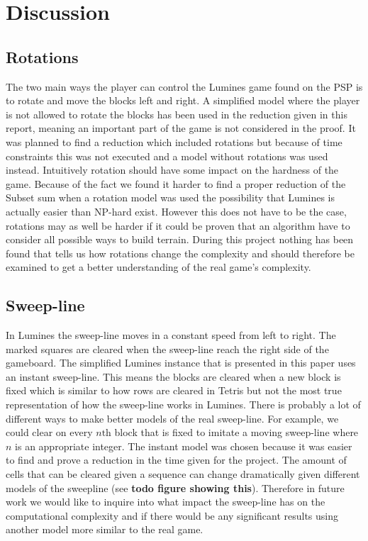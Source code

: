 \section{Discussion}
\label{discussion}

\subsection{Rotations}

The two main ways the player can control the Lumines game found on the PSP is to rotate and move the blocks left and right. A simplified model where the player is not allowed to rotate the blocks has been used in the reduction given in this report, meaning an important part of the game is not considered in the proof. It was planned to find a reduction which included rotations but because of time constraints this was not executed and a model without rotations was used instead. Intuitively rotation should have some impact on the hardness of the game. Because of the fact we found it harder to find a proper reduction of the Subset sum when a rotation model was used the possibility that Lumines is actually easier than NP-hard exist. However this does not have to be the case, rotations may as well be harder if it could be proven that an algorithm have to consider all possible ways to build terrain. During this project nothing has been found that tells us how rotations change the complexity and should therefore be examined to get a better understanding of the real game's complexity.

\subsection{Sweep-line}

In Lumines the sweep-line moves in a constant speed from left to right. The marked squares are cleared when the sweep-line reach the right side of the gameboard. The simplified Lumines instance that is presented in this paper uses an instant sweep-line. This means the blocks are cleared when a new block is fixed which is similar to how rows are cleared in Tetris but not the most true representation of how the sweep-line works in Lumines. There is probably a lot of different ways to make better models of the real sweep-line. For example, we could clear on every $n\text{th}$ block that is fixed to imitate a moving sweep-line where $n$ is an appropriate integer. The instant model was chosen because it was easier to find and prove a reduction in the time given for the project. The amount of cells that can be cleared given a sequence can change dramatically given different models of the sweepline (see \textbf{todo figure showing this}). Therefore in future work we would like to inquire into what impact the sweep-line has on the computational complexity and if there would be any significant results using another model more similar to the real game.


